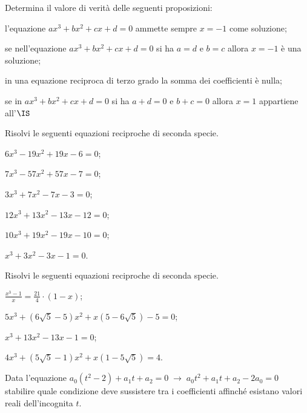 \begin{esercizio}
\label{ese:5.40}
Determina il valore di verità delle seguenti proposizioni:
\begin{enumeratea}
\item l'equazione $ax^3+bx^2+cx+d=0$ ammette sempre $x=-1$ come soluzione;
\item se nell'equazione $ax^3+bx^2+cx+d=0$ si ha $a=d$ e $b=c$ allora $x=-1$ è una soluzione;
\item in una equazione reciproca di terzo grado la somma dei coefficienti è nulla;
\item se in $ax^3+bx^2+cx+d=0$ si ha $a+d=0$ e $b+c=0$ allora $x=1$ appartiene all'$\IS$
\end{enumeratea}
\end{esercizio}

\begin{esercizio}[\Ast]
\label{ese:5.41}
Risolvi le seguenti equazioni reciproche di seconda specie.
\begin{multicols}{2}
\begin{enumeratea}
\item $6x^3-19x^2+19x-6=0$;
\item $7x^3-57x^2+57x-7=0$;
\item $3x^3+7x^2-7x-3=0$;
\item $12x^3+13x^2-13x-12=0$;
\item $10x^3+19x^2-19x-10=0$;
\item $x^3+3x^2-3x-1=0$.
\end{enumeratea}
\end{multicols}
\end{esercizio}

\begin{esercizio}[\Ast]
\label{ese:5.42}
Risolvi le seguenti equazioni reciproche di seconda specie.
\begin{multicols}{2}
\begin{enumeratea}
\item $\frac{x^3-1} x=\frac{21} 4\cdot (1-x)$;
\item $5x^3+(6\sqrt 5-5)x^2+x(5-6\sqrt 5)-5=0$;
\item $x^3+13x^2-13x-1=0$;
\item $4x^3+(5\sqrt 5-1)x^2+x(1-5\sqrt 5)=4$.
\end{enumeratea}
\end{multicols}
\end{esercizio}

\begin{esercizio}
\label{ese:5.43}
Data l'equazione $a_0\left(t^2-2\right)+a_1t+a_2=0\;\to \;a_0t^2+a_1t+a_2-2a_0=0$ stabilire quale condizione deve sussistere tra i coefficienti affinché esistano valori reali dell'incognita $ t $.
\end{esercizio}

